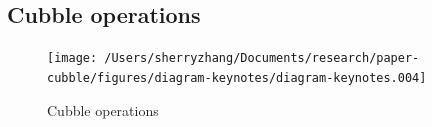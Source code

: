 \documentclass[
]{jss}
\begin{document}
\newpage

\hypertarget{cubble-operations}{%
\subsection{Cubble operations}\label{cubble-operations}}

\begin{CodeChunk}
\begin{figure}

{\centering \texttt{[image: /Users/sherryzhang/Documents/research/paper-cubble/figures/diagram-keynotes/diagram-keynotes.004]} 

}

\caption[Cubble operations]{Cubble operations}\label{fig:cubble-operations}
\end{figure}
\end{CodeChunk}


\end{document}

